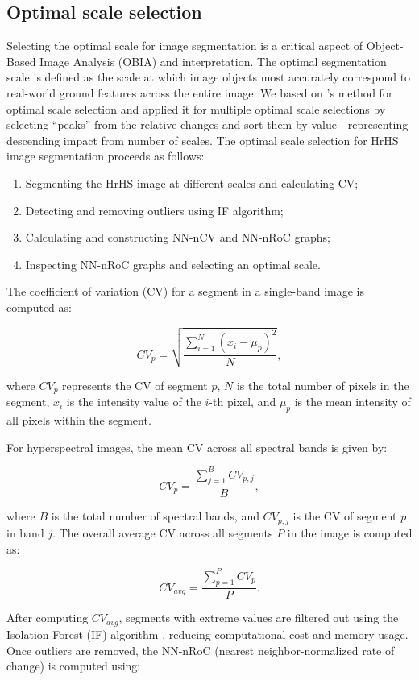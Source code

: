 \subsection{Optimal scale selection} \label{sec:optimal}

Selecting the optimal scale for image segmentation is a critical aspect of Object-Based Image Analysis (OBIA) and interpretation. The optimal segmentation scale is defined as the scale at which image objects most accurately correspond to real-world ground features across the entire image. We based on \citet{20-photo-j}’s method for optimal scale selection and applied it for multiple optimal scale selections by selecting ``peaks'' from the relative changes and sort them by value - representing descending impact from number of scales. The optimal scale selection for HrHS image segmentation proceeds as follows:
\begin{enumerate}
    \item Segmenting the HrHS image at different scales and calculating CV;
    \item Detecting and removing outliers using IF algorithm;
    \item Calculating and constructing NN-nCV and NN-nRoC graphs;
    \item Inspecting NN-nRoC graphs and selecting an optimal scale.
\end{enumerate}
The coefficient of variation (CV) for a segment in a single-band image is computed as:  

\[
CV_{p} = \sqrt{\frac{\sum_{i=1}^{N} (x_i - \mu_p)^2}{N}},
\]

where \(CV_{p}\) represents the CV of segment \(p\), \(N\) is the total number of pixels in the segment, \(x_i\) is the intensity value of the \(i\)-th pixel, and \(\mu_p\) is the mean intensity of all pixels within the segment.  

For hyperspectral images, the mean CV across all spectral bands is given by:  

\[
CV_{p} = \frac{\sum_{j=1}^{B} CV_{p,j}}{B},
\]

where \(B\) is the total number of spectral bands, and \(CV_{p,j}\) is the CV of segment \(p\) in band \(j\). The overall average CV across all segments \(P\) in the image is computed as:  

\[
CV_{avg} = \frac{\sum_{p=1}^{P} CV_{p}}{P}.
\]

After computing \(CV_{avg}\), segments with extreme values are filtered out using the Isolation Forest (IF) algorithm \citep{liu2012}, reducing computational cost and memory usage. Once outliers are removed, the NN-nRoC (nearest neighbor-normalized rate of change) is computed using:  

